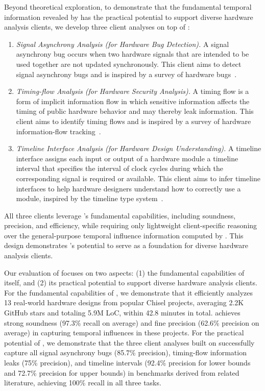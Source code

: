 Beyond theoretical exploration, to demonstrate that the fundamental temporal information revealed by \tia has the practical potential to support diverse hardware analysis clients, we develop three client analyses on top of \tia:
\begin{enumerate}[leftmargin=*]
    \item \emph{Signal Asynchrony Analysis (for Hardware Bug Detection).}
    A signal asynchrony bug occurs when two hardware signals that are intended to be used together are not updated synchronously.
    This client aims to detect signal asynchrony bugs and is inspired by a survey of hardware bugs~\cite{ma_debugging_2022}.

    \item \emph{Timing-flow Analysis (for Hardware Security Analysis).}
    A timing flow is a form of implicit information flow in which sensitive information affects the timing of public hardware behavior and may thereby leak information.
    This client aims to identify timing flows and is inspired by a survey of hardware information-flow tracking~\cite{hu_hardware_2022}.

    \item \emph{Timeline Interface Analysis (for Hardware Design Understanding).}
    A timeline interface assigns each input or output of a hardware module a timeline interval that specifies the interval of clock cycles during which the corresponding signal is required or available.
    This client aims to infer timeline interfaces to help hardware designers understand how to correctly use a module, inspired by the timeline type system~\cite{nigam_modular_2023}.
\end{enumerate}
All three clients leverage \tia's fundamental capabilities, including soundness, precision, and efficiency, while requiring only lightweight client-specific reasoning over the general-purpose temporal influence information computed by \tia.
This design demonstrates \tia's potential to serve as a foundation for diverse hardware analysis clients.

Our evaluation of \tia focuses on two aspects:
(1) the fundamental capabilities of \tia itself, and (2) its practical potential to support diverse hardware analysis clients.
For the fundamental capabilities of \tia, we demonstrate that it efficiently analyzes 13 real-world hardware designs from popular Chisel projects, averaging 2.2K GitHub stars and totaling 5.9M LoC, within 42.8 minutes in total.
\tia achieves strong soundness (97.3\% recall on average) and fine precision (62.6\% precision on average) in capturing temporal influences in these projects.
For the practical potential of \tia, we demonstrate that the three client analyses built on \tia successfully capture all signal asynchrony bugs (85.7\% precision), timing-flow information leaks (75\% precision), and timeline intervals (92.4\% precision for lower bounds and 72.7\% precision for upper bounds) in benchmarks derived from related literature, achieving 100\% recall in all three tasks.

